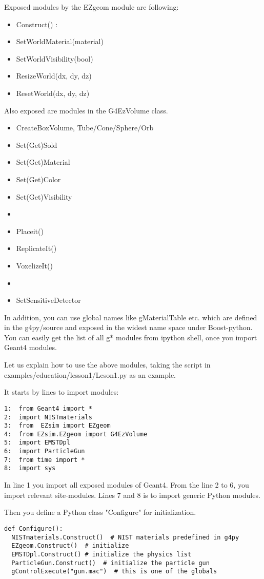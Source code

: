 \documentclass{article}
\begin{document}
 Exposed modules by the EZgeom module are following:
\begin{itemize}
 \item Construct() : 
 \item SetWorldMaterial(material)
 \item SetWorldVisibility(bool)
 \item ResizeWorld(dx, dy, dz)
 \item ResetWorld(dx, dy, dz)
\end{itemize}
Also exposed are modules in the G4EzVolume class. 
\begin{itemize}
 \item CreateBoxVolume,   Tube/Cone/Sphere/Orb
 \item Set(Get)Sold
 \item Set(Get)Material
 \item Set(Get)Color
 \item Set(Get)Visibility
 \item
 \item Placeit()
 \item ReplicateIt()
 \item VoxelizeIt()
 \item
 \item SetSensitiveDetector
\end{itemize}
 In addition, you can use global names like gMaterialTable etc. which are
defined in the g4py/source and exposed in the widest name space under 
Boost-python. You can easily get the list of all g* modules from ipython
shell, once you import Geant4 modules. 

 Let us explain how to use the above modules, taking the script in 
examples/education/lesson1/Leson1.py as an example.

It starts by lines to import modules:

\begin{verbatim}
1:  from Geant4 import *
2:  import NISTmaterials
3:  from  EZsim import EZgeom
4:  from EZsim.EZgeom import G4EzVolume
5:  import EMSTDpl
6:  import ParticleGun
7:  from time import *
8:  import sys
\end{verbatim}

In line 1 you import all exposed modules of Geant4.
From the line 2 to 6, you import relevant site-modules. Lines 7 and 8 is to
import generic Python modules.

Then you define a Python class "Configure" for initialization.

\begin{verbatim}
def Configure():
  NISTmaterials.Construct()  # NIST materials predefined in g4py
  EZgeom.Construct()  # initialize
  EMSTDpl.Construct() # initialize the physics list
  ParticleGun.Construct()  # initialize the particle gun
  gControlExecute("gun.mac")  # this is one of the globals
\end{verbatim}
\end{document}
